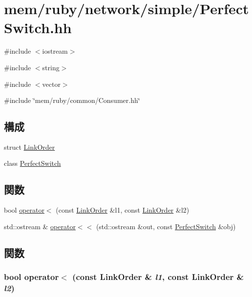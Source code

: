 \hypertarget{PerfectSwitch_8hh}{
\section{mem/ruby/network/simple/PerfectSwitch.hh}
\label{PerfectSwitch_8hh}
}
{\ttfamily \#include $<$iostream$>$}\par
{\ttfamily \#include $<$string$>$}\par
{\ttfamily \#include $<$vector$>$}\par
{\ttfamily \#include \char`\"{}mem/ruby/common/Consumer.hh\char`\"{}}\par
\subsection*{構成}
\begin{DoxyCompactItemize}
\item 
struct \hyperlink{structLinkOrder}{LinkOrder}
\item 
class \hyperlink{classPerfectSwitch}{PerfectSwitch}
\end{DoxyCompactItemize}
\subsection*{関数}
\begin{DoxyCompactItemize}
\item 
bool \hyperlink{PerfectSwitch_8hh_a1bcc63d7e1162f9ccc06def3d0e8a005}{operator$<$} (const \hyperlink{structLinkOrder}{LinkOrder} \&l1, const \hyperlink{structLinkOrder}{LinkOrder} \&l2)
\item 
std::ostream \& \hyperlink{PerfectSwitch_8hh_a4a6940d170ff9169a1516b65924daf2f}{operator$<$$<$} (std::ostream \&out, const \hyperlink{classPerfectSwitch}{PerfectSwitch} \&obj)
\end{DoxyCompactItemize}


\subsection{関数}
\hypertarget{PerfectSwitch_8hh_a1bcc63d7e1162f9ccc06def3d0e8a005}{
\subsubsection[{operator$<$}]{\setlength{\rightskip}{0pt plus 5cm}bool operator$<$ (const {\bf LinkOrder} \& {\em l1}, \/  const {\bf LinkOrder} \& {\em l2})}}
\label{PerfectSwitch_8hh_a1bcc63d7e1162f9ccc06def3d0e8a005}



